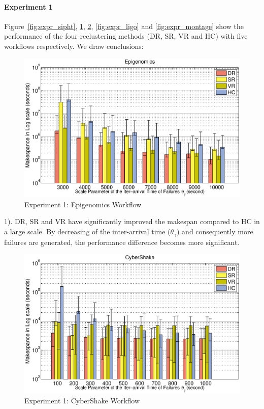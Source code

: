 \paragraph{\textbf{Experiment 1}}
Figure~\ref{fig:expr_sipht}, \ref{fig:expr_genome}, \ref{fig:expr_cybershake}, \ref{fig:expr_ligo} and \ref{fig:expr_montage} show the performance of the four reclustering methods (DR, SR, VR and HC) with five workflows respectively. We draw conclusions: 

\begin{figure}[!htb]
\centering
  \includegraphics[width=1.0\linewidth]{figures/tolerance/genome.eps}
  \caption{Experiment 1: Epigenomics Workflow}
  \label{fig:expr_genome}
\end{figure}


1). DR, SR and VR have significantly improved the makespan compared to HC in a large scale. By decreasing of the inter-arrival time ($\theta_{\gamma}$) and consequently more failures are generated, the performance difference becomes more significant. 


\begin{figure}[!htb]
\centering
  \includegraphics[width=1.0\linewidth]{figures/tolerance/cybershake.eps}
  \caption{Experiment 1: CyberShake Workflow}
  \label{fig:expr_cybershake}
\end{figure}






